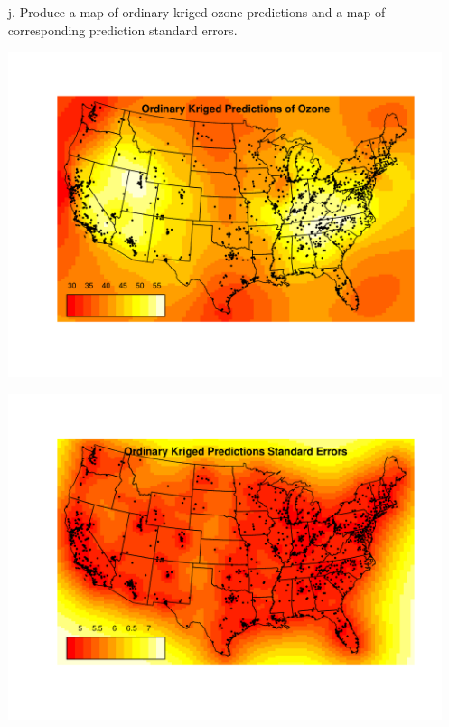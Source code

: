 \documentclass[letterpaper, 12pt]{article}\usepackage[]{graphicx}\usepackage[]{color}
\makeatletter
\def\maxwidth{ %
  \ifdim\Gin@nat@width>\linewidth
    \linewidth
  \else
    \Gin@nat@width
  \fi
}
\newenvironment{knitrout}{}{} %
\makeatother
\begin{document}
\begin{enumerate}
\begin{knitrout}
\end{knitrout}

\item[j.]
Produce a map of ordinary kriged ozone predictions and a map of corresponding prediction standard errors.

\begin{knitrout}
\color{fgcolor}
\includegraphics[width=\maxwidth]{figure/ok} 

\end{knitrout}


\begin{knitrout}
\color{fgcolor}
\includegraphics[width=\maxwidth]{figure/okresid} 


\end{knitrout}
\end{enumerate}
\end{document}
